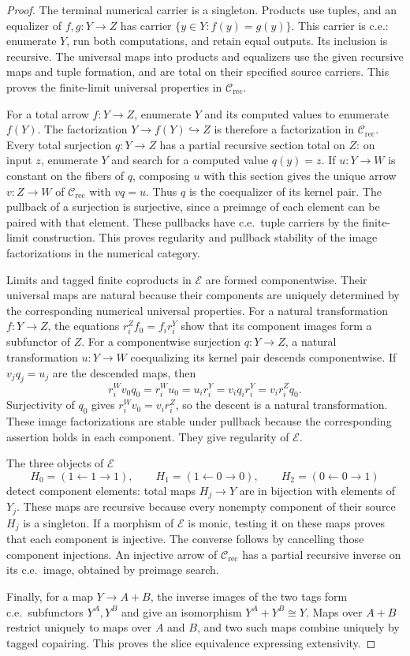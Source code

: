 \documentclass[11pt]{article}
\begin{document}
\begin{proof}
The terminal numerical carrier is a singleton. Products use tuples,
and an equalizer of $f,g:Y\to Z$ has carrier
$\{y\in Y:f(y)=g(y)\}$. This carrier is c.e.: enumerate $Y$, run
both computations, and retain equal outputs. Its inclusion is
recursive. The universal maps into products and equalizers use the
given recursive maps and tuple formation, and are total on their
specified source carriers. This proves the finite-limit universal
properties in $\mathcal C_{\mathrm{rec}}$.

For a total arrow $f:Y\to Z$, enumerate $Y$ and its computed
values to enumerate $f(Y)$. The factorization
$Y\to f(Y)\hookrightarrow Z$ is therefore a factorization in
$\mathcal C_{\mathrm{rec}}$. Every total surjection
$q:Y\to Z$ has a partial recursive section total on $Z$: on input
$z$, enumerate $Y$ and search for a computed value $q(y)=z$.
If $u:Y\to W$ is constant on the fibers of $q$, composing $u$
with this section gives the unique arrow $v:Z\to W$ of
$\mathcal C_{\mathrm{rec}}$ with $vq=u$. Thus $q$ is the
coequalizer of its kernel pair.
The pullback of a surjection is surjective, since a preimage of
each element can be paired with that element. These pullbacks
have c.e.\ tuple carriers by the finite-limit construction.
This proves regularity and pullback stability of the image
factorizations in the numerical category.

Limits and tagged finite coproducts in $\mathcal E$ are formed
componentwise. Their universal maps are natural because their
components are uniquely determined by the corresponding numerical
universal properties. For a natural transformation $f:Y\to Z$,
the equations $r_i^Zf_0=f_i r_i^Y$ show that its component images
form a subfunctor of $Z$.
For a componentwise surjection $q:Y\to Z$, a natural transformation
$u:Y\to W$ coequalizing its kernel pair descends componentwise.
If $v_jq_j=u_j$ are the descended maps, then
\[
 r_i^Wv_0q_0=r_i^Wu_0=u_i r_i^Y
 =v_iq_i r_i^Y=v_i r_i^Zq_0.
\]
Surjectivity of $q_0$ gives $r_i^Wv_0=v_i r_i^Z$, so the
descent is a natural transformation. These image factorizations are stable
under pullback because the corresponding assertion holds in
each component. They give regularity of $\mathcal E$.

The three objects of $\mathcal E$
\[
 H_0=(1\leftarrow1\to1),\qquad
 H_1=(1\leftarrow0\to0),\qquad
 H_2=(0\leftarrow0\to1)
\]
detect component elements: total maps $H_j\to Y$ are in bijection
with elements of $Y_j$. These maps are recursive because every
nonempty component of their source $H_j$ is a singleton.
If a morphism of $\mathcal E$ is monic,
testing it on these maps proves that each component is injective.
The converse follows by cancelling those component injections.
An injective arrow of $\mathcal C_{\mathrm{rec}}$ has a partial recursive inverse
on its c.e.\ image, obtained by preimage search.

Finally, for a map $Y\to A+B$, the inverse images of the two
tags form c.e.\ subfunctors $Y^A,Y^B$ and give an isomorphism
$Y^A+Y^B\cong Y$. Maps over $A+B$ restrict uniquely to maps
over $A$ and $B$, and two such maps combine uniquely by tagged
copairing. This proves the slice equivalence expressing extensivity.
\end{proof}
\end{document}
